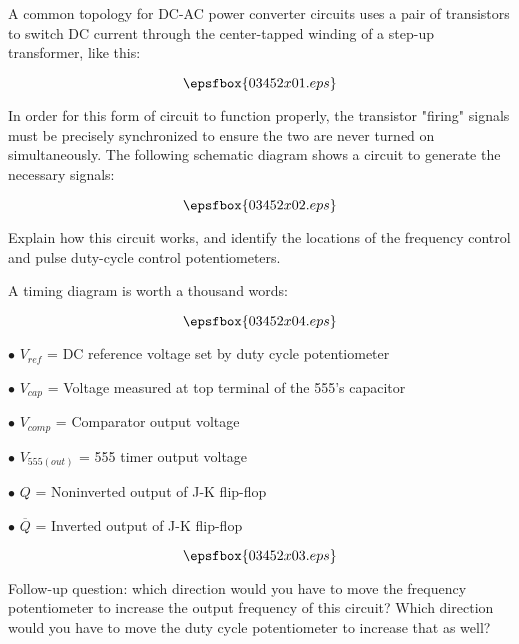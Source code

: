 

A common topology for DC-AC power converter circuits uses a pair of transistors to switch DC current through the center-tapped winding of a step-up transformer, like this:

$$\epsfbox{03452x01.eps}$$

In order for this form of circuit to function properly, the transistor "firing" signals must be precisely synchronized to ensure the two are never turned on simultaneously.  The following schematic diagram shows a circuit to generate the necessary signals:

$$\epsfbox{03452x02.eps}$$

Explain how this circuit works, and identify the locations of the frequency control and pulse duty-cycle control potentiometers.







A timing diagram is worth a thousand words:

$$\epsfbox{03452x04.eps}$$

\medskip
\item{$\bullet$} $V_{ref}$ = DC reference voltage set by duty cycle potentiometer
\item{$\bullet$} $V_{cap}$ = Voltage measured at top terminal of the 555's capacitor
\item{$\bullet$} $V_{comp}$ = Comparator output voltage
\item{$\bullet$} $V_{555(out)}$ = 555 timer output voltage
\item{$\bullet$} $Q$ = Noninverted output of J-K flip-flop
\item{$\bullet$} $\overline{Q}$ = Inverted output of J-K flip-flop
\medskip

$$\epsfbox{03452x03.eps}$$

\vskip 10pt

Follow-up question: which direction would you have to move the frequency potentiometer to increase the output frequency of this circuit?  Which direction would you have to move the duty cycle potentiometer to increase that as well?

\vskip 10pt

